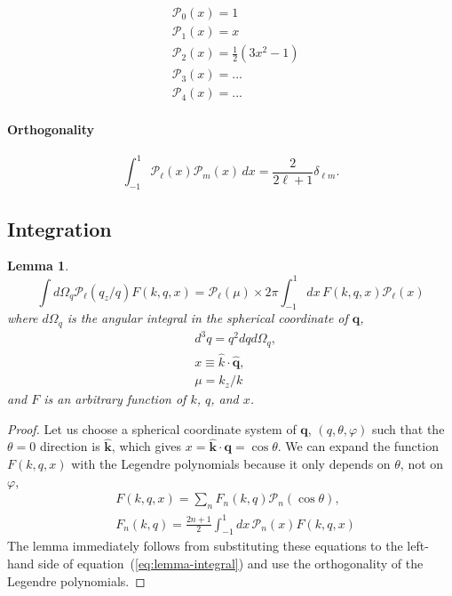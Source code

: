 \documentclass[a4paper,11pt, fleqn]{article}
\newtheorem{lemma}{Lemma}
\begin{document}
\begin{align}
  &\mathcal{P}_0(x) = 1\\
  &\mathcal{P}_1(x) = x\\
  &\mathcal{P}_2(x) = \frac{1}{2} (3x^2 - 1)\\
  &\mathcal{P}_3(x) = ...\\
  &\mathcal{P}_4(x) = ...
\end{align}

\vspace{4mm}

\paragraph{Orthogonality}
  
\begin{equation}
  \label{eq:legendre-orthognal}
  \int_{-1}^1 \mathcal{P}_\ell(x) \mathcal{P}_m(x) \, dx =
    \frac{2}{2\ell + 1} \delta_{\ell m}.
\end{equation}

\clearpage
\subsection{Integration}
\label{sec:integration}

\vspace{5mm}

\begin{lemma}
  \label{lemma-integral}
  \begin{equation}
    \label{eq:lemma-integral}
    \int \! d\Omega_q \mathcal{P}_\ell(q_z/q) F(k, q, x)
    = \mathcal{P}_\ell(\mu)
      \times 2\pi \int_{-1}^1 \! dx \, F(k, q, x) \mathcal{P}_\ell(x)
  \end{equation}
  where $d\Omega_q$ is the angular integral in the spherical coordinate
  of $\bm{q}$,
  \begin{align}
    &d^3 q = q^2 dq d\Omega_q,\\
    &x \equiv \hat{k}\cdot\hat{\bm{q}},\\
    &\mu = k_z/k
  \end{align}
  and $F$ is an arbitrary
  function of $k$, $q$, and $x$.
\end{lemma}

\begin{proof}
Let us choose a spherical coordinate system of $\bm{q}$, $(q, \theta,
\varphi)$ such that the $\theta = 0$ direction is $\hat{\bm{k}}$,
which gives $x = \hat{\bm{k}}\cdot\bm{\bm{q}} = \cos\theta$. We can expand
the function $F(k, q, x)$ with the Legendre polynomials because it
only depends on $\theta$, not on $\varphi$,
\begin{align}
  &F(k, q, x) = \sum_n F_{n}(k, q) \mathcal{P}_n(\cos\theta),\\
  &F_{n}(k, q) = \frac{2n + 1}{2} \int_{-1}^1 \! dx \,\mathcal{P}_n(x) F(k, q, x)
\end{align}
The lemma immediately follows from substituting these equations to the
left-hand side of equation~(\ref{eq:lemma-integral}) and use the
orthogonality of the Legendre polynomials.
\end{proof}
\end{document}

